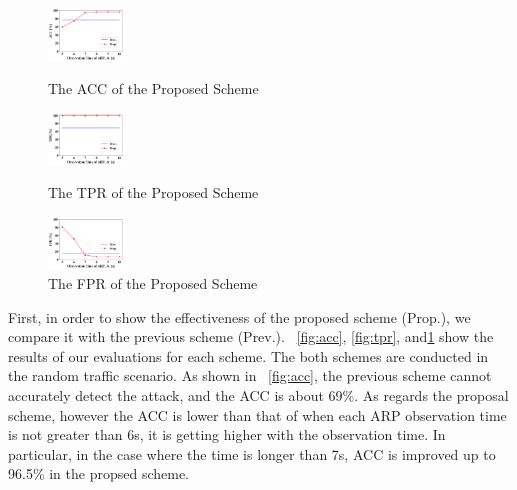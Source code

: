 \documentclass[conference]{IEEEtran}
\begin{document}
\begin{figure}[t]
    \begin{minipage}{0.33\hsize}
        \begin{center}
            \includegraphics[width=20mm,bb=9 9 358 434]{image/ACC.png}
        \end{center}
        \caption{The ACC of the Proposed Scheme}
        \label{fig:acc}
    \end{minipage}
    \begin{minipage}{0.33\hsize}
        \begin{center}
            \includegraphics[width=20mm,bb=9 9 358 434]{image/TPR.png}
        \end{center}
        \caption{The TPR of the Proposed Scheme}
        \label{fig:tpr}
    \end{minipage}
    \begin{minipage}{0.33\hsize}
        \begin{center}
            \includegraphics[width=20mm,bb=9 9 358 434]{image/FPR.png}
        \end{center}
        \caption{The FPR of the Proposed Scheme}
        \label{fig:fpr}
    \end{minipage}

\end{figure}
First, in order to show the effectiveness of the proposed scheme (Prop.), we compare it with the previous scheme \cite{previous} (Prev.).
\figurename~\ref{fig:acc}, \ref{fig:tpr}, and\ref{fig:fpr} show the results of our evaluations for each scheme.
The both schemes are conducted in the random traffic scenario.
As shown in \figurename~\ref{fig:acc}, the previous scheme cannot accurately detect the attack, and the ACC is about 69\%.
As regards the proposal scheme, however the ACC is lower than that of \cite{previous} when each ARP observation time is not greater than 6s, it is getting higher with the observation time.
In particular, in the case where the time is longer than 7s, ACC is improved up to 96.5\% in the propsed scheme.
\end{document}
